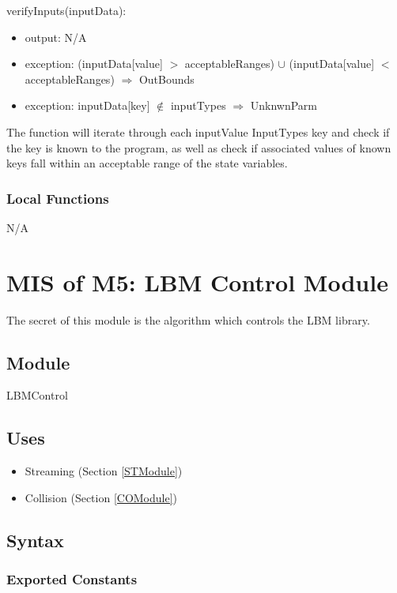 \documentclass[12pt, titlepage]{article}
\begin{document}
\noindent verifyInputs(inputData):
\begin{itemize}
	\item output: N/A
	\item exception: (inputData[value] $>$ acceptableRanges) $\cup$ (inputData[value] $<$ acceptableRanges) $\Rightarrow$ OutBounds
	\item exception: inputData[key] $\notin$ inputTypes $\Rightarrow$ UnknwnParm
\end{itemize}

The function will iterate through each inputValue InputTypes key and check if the key is known to the program, as well as check if associated values of known keys fall within an acceptable range of the state variables.

\subsubsection{Local Functions}

N/A

\newpage

\section{MIS of M5: LBM Control Module} \label{LCModule}

The secret of this module is the algorithm which controls the LBM library.

\subsection{Module}

LBMControl

\subsection{Uses}

\begin{itemize}
	\item Streaming (Section \ref{STModule})
	\item Collision (Section \ref{COModule})
\end{itemize}

\subsection{Syntax}

\subsubsection{Exported Constants}
\end{document}
